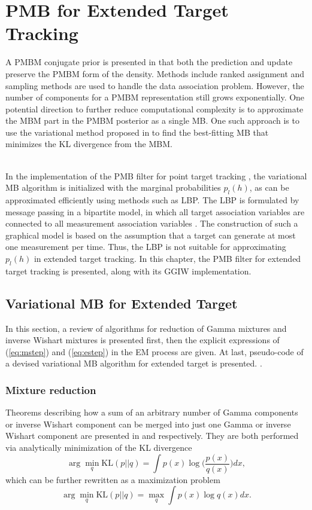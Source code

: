 \chapter{PMB for Extended Target Tracking}
A PMBM conjugate prior is presented in \cite{pmbmextended,pmbmextended2} that both the prediction and update preserve the PMBM form of the density. Methods include ranked assignment and sampling methods are used to handle the data association problem. However, the number of components for a PMBM representation still grows exponentially. One potential direction to further reduce computational complexity is to approximate the MBM part in the PMBM posterior as a single MB. One such approach is to use the variational method proposed in \cite{variational} to find the best-fitting MB that minimizes the KL divergence from the MBM. 

~\\
In the implementation of the PMB filter for point target tracking \cite{variational}, the variational MB algorithm is initialized with the marginal probabilities $p_l(h)$, as can be approximated efficiently using methods such as LBP. The LBP is formulated by message passing in a bipartite model, in which all target association variables are connected to all measurement association variables \cite{lbp}. The construction of such a graphical model is based on the assumption that a target can generate at most one measurement per time. Thus, the LBP is not suitable for approximating $p_l(h)$ in extended target tracking. In this chapter, the PMB filter for extended target tracking is presented, along with its GGIW implementation.  

\section{Variational MB for Extended Target}
In this section, a review of algorithms for reduction of Gamma mixtures and inverse Wishart mixtures \cite{phdextended,gammareduction} is presented first, then the explicit expressions of (\ref{eq:mstep}) and (\ref{eq:estep}) in the EM process are given. At last, pseudo-code of a devised variational MB algorithm for extended target is presented. \cite{simplex}. 

\subsection{Mixture reduction}
Theorems describing how a sum of an arbitrary number of Gamma components or inverse Wishart component can be merged into just one Gamma or inverse Wishart component are presented in \cite{gammareduction} and \cite{phdextended} respectively. They are both performed via analytically minimization of the KL divergence
\begin{equation}
    \arg\min\limits_q\text{KL}(p||q) = \int p(x)\log\bigg(\frac{p(x)}{q(x)}\bigg)dx,
\end{equation}
which can be further rewritten as a maximization problem
\begin{equation}
    \arg\min\limits_q\text{KL}(p||q) = \max\limits_q\int p(x)\log q(x)dx.
\end{equation}
